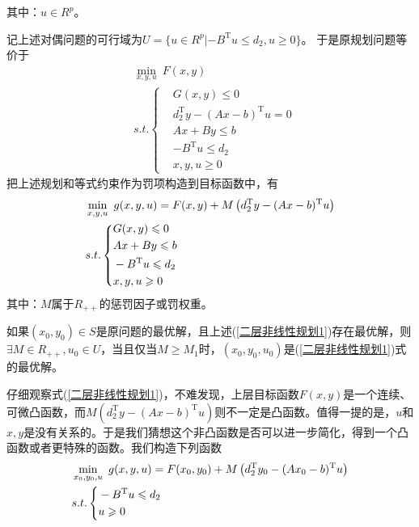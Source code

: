         其中：$u\in R^p$。
        \par
        记上述对偶问题的可行域为$U=\{u\in R^p|-B^\mathrm{T} u\leqslant d_2, u\geqslant 0\}$。
        于是原规划问题等价于
        \begin{align*}
            &\mathop{\min}\limits_{x,y,u}\  F(x,y)\\
            &s.t.\left\{
            \begin{aligned}
            & G(x,y)\leqslant 0\\
            & d_2^\mathrm{T} y-(Ax-b)^\mathrm{T} u=0\\
            & Ax+By \leqslant b\\
            & -B^\mathrm{T} u\leqslant d_2\\
            & x,y,u \geqslant 0
            \end{aligned}
            \right.
        \end{align*}
        把上述规划和等式约束作为罚项构造到目标函数中，有
            \begin{align}
            \label{二层非线性规划1}
            &\mathop{\min}\limits_{x,y,u}\  g(x,y,u)=F(x,y)+M\left(d_2^\mathrm{T} y-(Ax-b)^\mathrm{T} u\right) \\
            &s.t.\left\{
            \begin{aligned}
             & G(x,y)\leqslant 0\notag \\
             & Ax+By \leqslant b\\
             & -B^\mathrm{T} u\leqslant d_2\notag \\
             & x,y,u \geqslant 0\notag
            \end{aligned}
            \right.\notag
            \end{align}
        其中：$M$属于$R_{++}$的惩罚因子或罚权重。
        \begin{theorem}
        如果$(x_0,y_0)\in S$是原问题的最优解，且上述(\ref{二层非线性规划1})存在最优解，则$\exists M\in R_{++},u_0\in U$，当且仅当$M\geqslant M_1$时，$(x_0,y_0,u_0)$是(\ref{二层非线性规划1})式的最优解。
        \end{theorem}
        \par
        仔细观察式(\ref{二层非线性规划1})，不难发现，上层目标函数$F(x,y)$是一个连续、可微凸函数，而$M\left(d_2^\mathrm{T} y-(Ax-b)^\mathrm{T} u\right)$则不一定是凸函数。值得一提的是，$u$和$x,y$是没有关系的。于是我们猜想这个非凸函数是否可以进一步简化，得到一个凸函数或者更特殊的函数。我们构造下列函数
            \begin{align}
            \label{二层非线性规划2}
            & \mathop{\min}\limits_{x_0,y_0,u}\ g(x,y,u)=F(x_0,y_0)+M\left(d_2^\mathrm{T} y_0-(Ax_0-b)^\mathrm{T} u\right) \\
            &s.t.\left\{
            \begin{aligned}
             & -B^\mathrm{T} u\leqslant d_2\notag \\
             & u \geqslant 0\notag
            \end{aligned}
            \right.
            \end{align}
